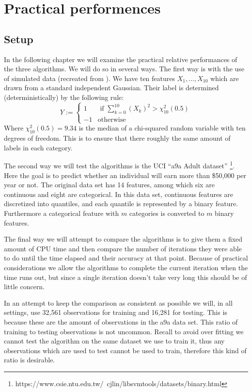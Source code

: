 


\chapter{Practical performences}
\label{chap:pracPerf}
\section{Setup}
\label{sec:Setup}
In the following chapter we will examine the practical relative performances of the three algorithms. We will do so in several ways. The first way is with the use of simulated data (recreated from \cite{Hastie2009}). We have ten features $X_1,\ldots,X_{10}$ which are drawn from a standard independent Gaussian. Their label is determined (deterministically) by the following rule: $$Y:=\begin{cases}
1 & \text{ if } \sum_{k=0}^{10} (X_k)^2 > \chi_{10}^2(0.5)\\
-1 & \text{otherwise}
\end{cases}$$ Where $\chi_{10}^2(0.5)=9.34$ is the median of a chi-squared random variable with ten degrees of freedom. This is to ensure that there roughly the same amount of labels in each category. 

\par The second way we will test the algorithms is the UCI ``a9a Adult dataset'' \footnote{https://www.csie.ntu.edu.tw/~cjlin/libsvmtools/datasets/binary.html}. Here the goal is to predict whether an individual will earn more than \$50,000 per year or not. The original data set has 14 features, among which six are continuous and eight are categorical. In this data set, continuous features are discretized into quantiles, and each quantile is represented by a binary feature. Furthermore a categorical feature with $m$ categories is converted to $m$ binary features. 

\par The final way we will attempt to compare the algorithms is to give them a fixed amount of CPU time and then compare the number of iterations they were able to do until the time elapsed and their accuracy at that point. Because of practical considerations we allow the algorithms to complete the current iteration when the time runs out, but since a single iteration doesn't take very long this should be of little concern.

\par In an attempt to keep the comparison as consistent as possible we will, in all settings, use 32,561 observations for training and 16,281 for testing. This is because these are the amount of observations in the a9a data set. This ratio of training to testing observations is not uncommon. Recall to avoid over fitting we cannot test the algorithm on the same dataset we use to train it, thus any observations which are used to test cannot be used to train, therefore this kind of ratio is desirable.

